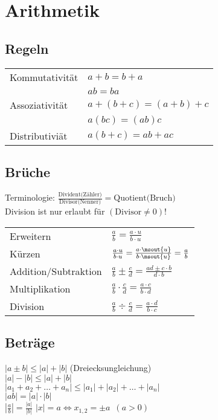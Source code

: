 \section{Arithmetik}
\subsection{Regeln}
\settowidth{\MyLenA}{Kommutativität~~}
\begin{tabular}{@{}p{\the\MyLenA}%
				@{}p{\linewidth-\the\MyLenA}}
	Kommutativität	& $a + b = b + a$\\
					& $ab = ba$\\
	Assoziativität 	& $a + (b + c) = (a + b) + c$\\
					& $a(bc) = (ab)c$\\
	Distributiviät	& $a(b + c) = ab + ac$\\
\end{tabular}

\subsection{Brüche}
Terminologie: $\frac{\mbox{Divident(Zähler)}}{\mbox{Divisor(Nenner)}} = \mbox{Quotient(Bruch)}$\\
Division ist nur erlaubt für $(\mbox{Divisor} \neq 0)$!
\settowidth{\MyLenA}{Addition/Subtraktion~~}
\begin{tabular}{@{}p{\the\MyLenA}%
				@{}p{\linewidth-\the\MyLenA}}
	Erweitern				& $\frac{a}{b} = \frac{a \cdot u}{b \cdot u}$\\
	Kürzen					& $\frac{a \cdot u}{b \cdot u} = \frac{a \cdot \msout{u}}{b \cdot \msout{u}} = \frac{a}{b}$\\
	Addition/Subtraktion	& $\frac{a}{b} \pm \frac{c}{d} = \frac{ad \pm c \cdot b}{d \cdot b}$\\
	Multiplikation 			& $\frac{a}{b} \cdot \frac{c}{d} = \frac{a \cdot c}{b \cdot d}$\\
	Division				& $\frac{a}{b} \div {\frac{c}{d}} = \frac{a \cdot d}{b \cdot c}$\\
\end{tabular}

\subsection{Beträge}
$\left|a \pm b\right| \leq \left|a\right| + \left|b\right|$ (Dreiecksungleichung)\\
$\left|a\right| - \left|b\right| \leq \left|a\right| + \left|b\right|$\\
$\left|a_{1} + a_{2} + \dots + a_{n}\right| \leq \left|a_{1}\right| + \left|a_{2}\right| + \dots + \left|a_{n}\right|$\\
$\left|ab\right| = \left|a\right| \cdot \left|b\right|$\\
$\left|\frac{a}{b}\right| = \frac{\left|a\right|}{\left|b\right|}$
$\left|x\right| = a \Leftrightarrow x_{1,2} = \pm a\,\,\,(a > 0)$\\

